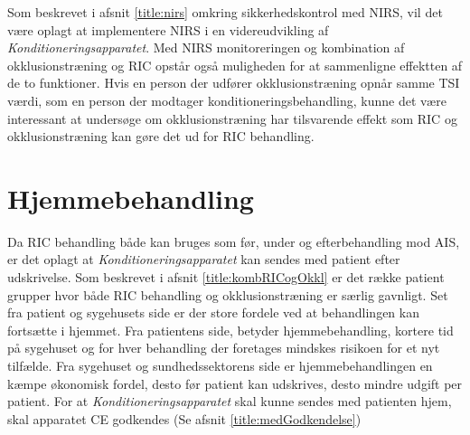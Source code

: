 Som beskrevet i afsnit \ref{title:nirs} omkring sikkerhedskontrol med NIRS, vil det være oplagt at implementere NIRS i en videreudvikling af \textit{Konditioneringsapparatet}. Med NIRS monitoreringen og kombination af okklusionstræning og RIC opstår også muligheden for at sammenligne effektten af de to funktioner. Hvis en person der udfører okklusionstræning opnår samme TSI værdi, som en person der modtager konditioneringsbehandling, kunne det være interessant at undersøge om okklusionstræning har tilsvarende effekt som RIC og okklusionstræning kan gøre det ud for RIC behandling. 

\section{Hjemmebehandling}\label{title:Hjemmebehandling}
Da RIC behandling både kan bruges som før, under og efterbehandling mod AIS, er det oplagt at \textit{Konditioneringsapparatet} kan sendes med patient efter udskrivelse. Som beskrevet i afsnit \ref{title:kombRICogOkkl} er det række patient grupper hvor både RIC behandling og okklusionstræning er særlig gavnligt. Set fra patient og sygehusets side er der store fordele ved at behandlingen kan fortsætte i hjemmet. Fra patientens side, betyder hjemmebehandling, kortere tid på sygehuset og for hver behandling der foretages mindskes risikoen for et nyt tilfælde. Fra sygehuset og sundhedssektorens side er hjemmebehandlingen en kæmpe økonomisk fordel, desto før patient kan udskrives, desto mindre udgift per patient. 
For at \textit{Konditioneringsapparatet} skal kunne sendes med patienten hjem, skal apparatet CE godkendes (Se afsnit \ref{title:medGodkendelse})